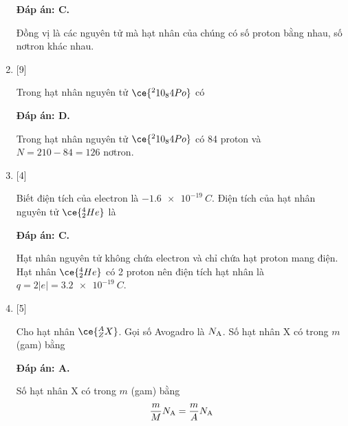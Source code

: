 \begin{enumerate}[label=\bfseries Câu \arabic*:]
	\loigiai
	{		\textbf{Đáp án: C.}
		
		Đồng vị là các nguyên tử mà hạt nhân của chúng có số proton bằng nhau, số nơtron khác nhau.
		
	}
	\item {} [9]
	\cauhoi
	{Trong hạt nhân nguyên tử $\ce{^210_84 Po}$ có
	}
	
	\loigiai
	{		\textbf{Đáp án: D.}
		
		Trong hạt nhân nguyên tử $\ce{^210_84 Po}$ có 84 proton và $N=210-84=126$ nơtron.
		
	}
	\item {} [4]
	\cauhoi
	{Biết điện tích của electron là $\SI{-1.6e-19}{C}$. Điện tích của hạt nhân nguyên tử $\ce{^4_2 He}$ là
	}
	
	\loigiai
	{		\textbf{Đáp án: C.}
		
		Hạt nhân nguyên tử không chứa electron và chỉ chứa hạt proton mang điện. Hạt nhân $\ce{^4_2 He}$ có 2 proton nên điện tích hạt nhân là $q=2|e|=\SI{3.2e-19}{C}$.
		
	}
	\item {} [5]
	\cauhoi
	{Cho hạt nhân $\ce{^A_Z X}$. Gọi số Avogadro là $N_\text A$. Số hạt nhân X có trong $m$ (gam) bằng
	}
	
	\loigiai
	{		\textbf{Đáp án: A.}
		
		Số hạt nhân X có trong $m$ (gam) bằng
		$$\dfrac{m}{M} N_\text{A} = \dfrac{m}{A} N_\text A$$
		
}
\end{enumerate}
